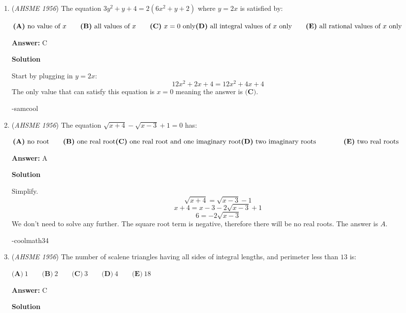 \begin{enumerate}
 


	\item (\textit{AHSME 1956}) The equation $3y^2 + y + 4 = 2(6x^2 + y + 2)$ where $y = 2x$ is satisfied by: 


 $\textbf{(A)}\ \text{no value of }x \qquad \textbf{(B)}\ \text{all values of }x \qquad \textbf{(C)}\ x = 0\text{ only} \\ \textbf{(D)}\ \text{all integral values of }x\text{ only} \qquad \textbf{(E)}\ \text{all rational values of }x\text{ only}$

 \textbf{Answer: }C



\textbf{Solution}

Start by plugging in $y=2x:$
 \[12x^2 + 2x + 4 = 12x^2 + 4x + 4\]The only value that can satisfy this equation is $x=0$ meaning the answer is $\boxed{\textbf{(C)}}.$

 -samcool

 


	\item (\textit{AHSME 1956}) The equation $\sqrt {x + 4} - \sqrt {x - 3} + 1 = 0$ has: 


 $\textbf{(A)}\ \text{no root} \qquad  \textbf{(B)}\ \text{one real root} \\ \textbf{(C)}\ \text{one real root and one imaginary root} \\ \textbf{(D)}\ \text{two imaginary roots} \qquad \qquad\textbf{(E)}\ \text{two real roots}$

 \textbf{Answer: }A



\textbf{Solution}

Simplify.
 \[\sqrt {x + 4} = \sqrt{x-3} -1\]
 \[x + 4 = x - 3 -2\sqrt{x-3} + 1\]
 \[6 = -2\sqrt{x-3}\]We don't need to solve any further. The square root term is negative, therefore there will be no real roots. The answer is $\boxed{A}.$

 -coolmath34

 


	\item (\textit{AHSME 1956}) The number of scalene triangles having all sides of integral lengths, and perimeter less than $13$ is: 


 $\textbf{(A)}\ 1 \qquad\textbf{(B)}\ 2 \qquad\textbf{(C)}\ 3 \qquad\textbf{(D)}\ 4 \qquad\textbf{(E)}\ 18$

 \textbf{Answer: }C



\textbf{Solution}


\end{enumerate}
